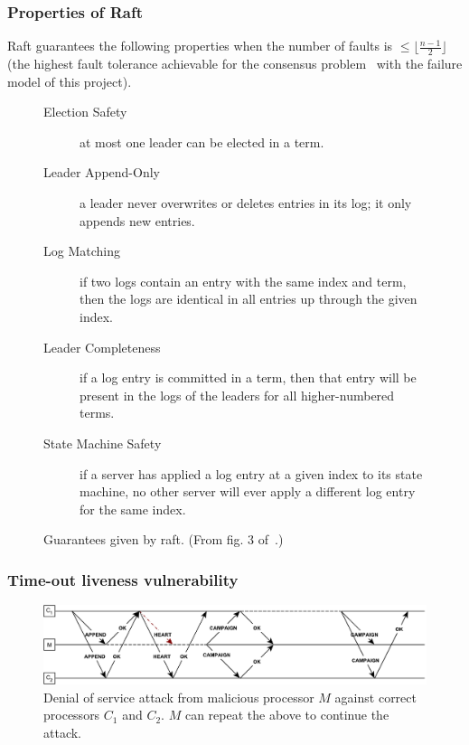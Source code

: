 \documentclass{article}
\begin{document}
	\subsubsection*{Properties of Raft}

	Raft guarantees the following properties when the number of faults is $\le \lfloor \frac{n - 1}{2} \rfloor$ (the highest fault tolerance achievable for the consensus problem~\cite{lamport_lower_2006} with the failure model of this project).
	\begin{figure}[ht!]
	  \centering
	  \begin{minipage}{0.8\textwidth}
	    \begin{mdframed}
	      \begin{description}
	        \item[Election Safety] at most one leader can be elected in a term.
	        \item[Leader Append-Only] a leader never overwrites or deletes entries in its log; it only appends new entries.
	        \item[Log Matching] if two logs contain an entry with the same index and term, then the logs are identical in all entries up through the given index.
	        \item[Leader Completeness] if a log entry is committed in a term, then that entry will be present in the logs of the leaders for all higher-numbered  terms.
	        \item[State Machine Safety] if a server has applied a log entry at a given index to its state machine, no other server will ever apply a different log entry for the same index.
	      \end{description}
	    \end{mdframed}
	  \end{minipage}
	  \caption{Guarantees given by raft. (From fig. 3 of~\cite{ongaro_search_2014}.)}
	  \label{fig:raft-properties}
	\end{figure}

	\subsubsection*{Time-out liveness vulnerability}

	\begin{figure}[t]
	  \centering
	  \includegraphics[width=\textwidth]{figures/raft-liveness-vuln.pdf}
	  \caption{Denial of service attack from malicious processor $M$ against correct processors $C_1$ and $C_2$. $M$ can repeat the above to continue the attack.}
	\end{figure}
\end{document}
